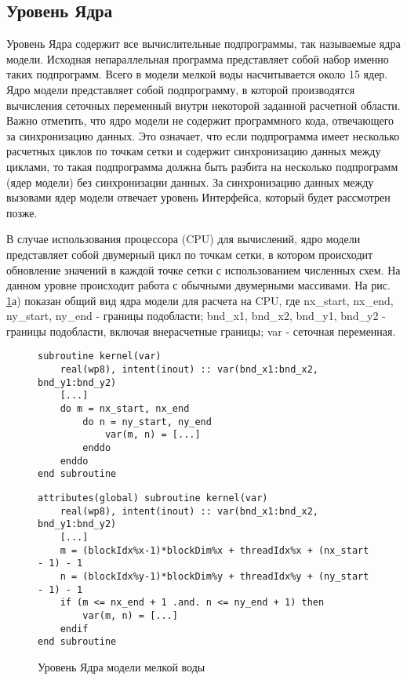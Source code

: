 \subsection{Уровень Ядра}

Уровень Ядра содержит все вычислительные подпрограммы, так называемые ядра модели. Исходная непараллельная программа представляет собой набор именно таких подпрограмм.
Всего в модели мелкой воды насчитывается около 15 ядер. Ядро модели представляет собой подпрограмму, в которой производятся вычисления сеточных переменный внутри некоторой заданной расчетной области. Важно отметить, что ядро модели не содержит программного кода, отвечающего за синхронизацию данных.
Это означает, что если подпрограмма имеет несколько расчетных циклов по точкам сетки и содержит синхронизацию данных между циклами, то такая подпрограмма должна быть разбита на несколько подпрограмм (ядер модели) без синхронизации данных.
За синхронизацию данных между вызовами ядер модели отвечает уровень Интерфейса, который будет рассмотрен позже.

В случае использования процессора (CPU) для вычислений, ядро модели представляет собой двумерный цикл по точкам сетки, в котором происходит обновление значений в каждой точке сетки с использованием численных схем.
На данном уровне происходит работа с обычными двумерными массивами.
На рис. \ref{fig:kernel}а) показан общий вид ядра модели для расчета на CPU, где nx\_start, nx\_end, ny\_start, ny\_end - границы подобласти; bnd\_x1, bnd\_x2, bnd\_y1, bnd\_y2 - границы подобласти, включая внерасчетные границы; var - сеточная переменная.

\begin{figure}[!ht]
	\begin{minipage}{\linewidth}
		\centering
		\begin{lstlisting}
subroutine kernel(var)
	real(wp8), intent(inout) :: var(bnd_x1:bnd_x2, bnd_y1:bnd_y2)
	[...]
	do m = nx_start, nx_end
		do n = ny_start, ny_end
			var(m, n) = [...]
		enddo
	enddo
end subroutine
		\end{lstlisting}
	\end{minipage}
	\begin{minipage}{\linewidth}
		\centering
		\begin{lstlisting}
attributes(global) subroutine kernel(var)
	real(wp8), intent(inout) :: var(bnd_x1:bnd_x2, bnd_y1:bnd_y2)
	[...]
	m = (blockIdx%x-1)*blockDim%x + threadIdx%x + (nx_start - 1) - 1
	n = (blockIdx%y-1)*blockDim%y + threadIdx%y + (ny_start - 1) - 1
	if (m <= nx_end + 1 .and. n <= ny_end + 1) then
		var(m, n) = [...]
	endif
end subroutine
		\end{lstlisting}
	\end{minipage}
	\vspace{3pt}
	\caption{Уровень Ядра модели мелкой воды}
	\label{fig:kernel}
\end{figure}

